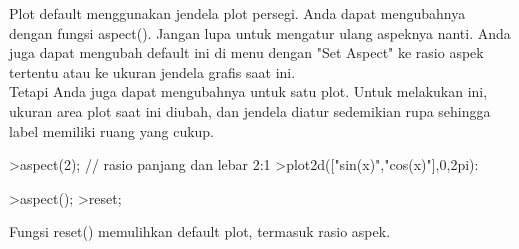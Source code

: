 \documentclass[12pt,arial,letterpaper]{book}
\begin{document}
\begin{eulernootebook}
\begin{eulercomment}
\begin{eulercomment}
\begin{eulernootebook}
\begin{eulercomment}
\begin{eulercomment}
\begin{eulercomment}
\begin{eulercomment}
\begin{eulercomment}
\begin{eulercomment}
\begin{eulercomment}
\begin{eulernotebook}
\begin{eulercomment}
\end{eulercomment}
\begin{eulercomment}
Plot default menggunakan jendela plot persegi. Anda dapat mengubahnya
dengan fungsi aspect(). Jangan lupa untuk mengatur ulang aspeknya
nanti. Anda juga dapat mengubah default ini di menu dengan "Set
Aspect" ke rasio aspek tertentu atau ke ukuran jendela grafis saat
ini.\\
Tetapi Anda juga dapat mengubahnya untuk satu plot. Untuk melakukan
ini, ukuran area plot saat ini diubah, dan jendela diatur sedemikian
rupa sehingga label memiliki ruang yang cukup.
\end{eulercomment}
\begin{eulerprompt}
>aspect(2); // rasio panjang dan lebar 2:1
>plot2d(["sin(x)","cos(x)"],0,2pi):
\end{eulerprompt}
\begin{eulerprompt}
>aspect();
>reset;
\end{eulerprompt}
\begin{eulercomment}
Fungsi reset() memulihkan default plot, termasuk rasio aspek.


\end{eulercomment}
\end{eulernotebook}
\end{eulercomment}
\end{eulercomment}
\end{eulercomment}
\end{eulercomment}
\end{eulercomment}
\end{eulercomment}
\end{eulercomment}
\end{eulernootebook}
\end{eulercomment}
\end{eulercomment}
\end{eulernootebook}
\end{document}
